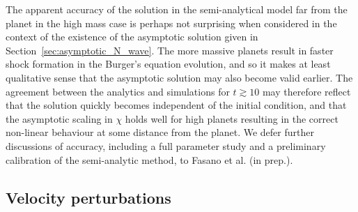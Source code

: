 The apparent accuracy of the solution in the semi-analytical model far from the planet in the high mass case is perhaps not surprising when considered in the context of the existence of the asymptotic solution given in Section~\ref{sec:asymptotic_N_wave}.
The more massive planets result in faster shock formation in the Burger's equation evolution, and so it makes at least qualitative sense that the asymptotic solution may also become valid earlier.
The agreement between the analytics and simulations for $t \gtrsim 10$ may therefore reflect that the solution quickly becomes independent of the initial condition, and that the asymptotic scaling in $\chi$ holds well for high planets resulting in the correct non-linear behaviour at some distance from the planet.
We defer further discussions of accuracy, including a full parameter study and a preliminary calibration of the semi-analytic method, to Fasano et al. (in prep.).

\subsection{Velocity perturbations} \label{sec:velocity_perts}

